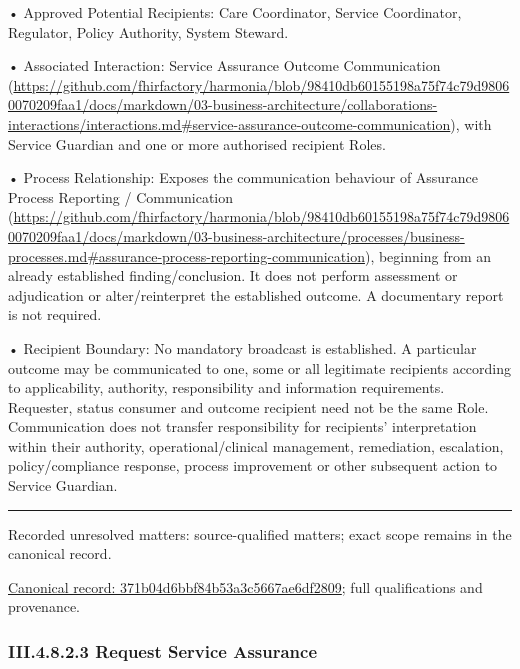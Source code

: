 •
Approved Potential Recipients: Care Coordinator, Service Coordinator, Regulator, Policy Authority, System Steward.



•
Associated Interaction: Service Assurance Outcome Communication (\url{https://github.com/fhirfactory/harmonia/blob/98410db60155198a75f74c79d98060070209faa1/docs/markdown/03-business-architecture/collaborations-interactions/interactions.md#service-assurance-outcome-communication}), with Service Guardian and one or more authorised recipient Roles.



•
Process Relationship: Exposes the communication behaviour of Assurance Process Reporting / Communication (\url{https://github.com/fhirfactory/harmonia/blob/98410db60155198a75f74c79d98060070209faa1/docs/markdown/03-business-architecture/processes/business-processes.md#assurance-process-reporting-communication}), beginning from an already established finding/conclusion. It does not perform assessment or adjudication or alter/reinterpret the established outcome. A documentary report is not required.



•
Recipient Boundary: No mandatory broadcast is established. A particular outcome may be communicated to one, some or all legitimate recipients according to applicability, authority, responsibility and information requirements. Requester, status consumer and outcome recipient need not be the same Role. Communication does not transfer responsibility for recipients' interpretation within their authority, operational/clinical management, remediation, escalation, policy/compliance response, process improvement or other subsequent action to Service Guardian.



\medskip\hrule\medskip

{\small Recorded unresolved matters: source-qualified matters; exact scope remains in the canonical record.}\par
{\footnotesize \href{../../../../../../../../continuum/business/business-service/371b04d6bbf84b53a3c5667ae6df2809.md}{Canonical record: 371b04d6bbf84b53a3c5667ae6df2809}; full qualifications and provenance.}\par
\subsubsection*{III.4.8.2.3 Request Service Assurance}
\label{navigation:III.4.8.2.3}

